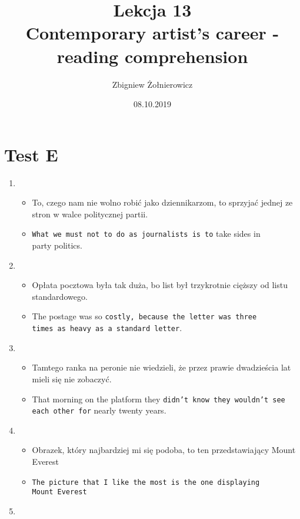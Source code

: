 \documentclass[a4paper]{article}
\begin{document}
\title{{\huge Lekcja 13} \\
{\large Contemporary artist's career - reading comprehension}}
\author{Zbigniew Żołnierowicz}
\date{08.10.2019}
\maketitle
\section{Test E}
\begin{enumerate}
    \item \begin{itemize}
        \item To, czego nam nie wolno robić jako dziennikarzom, to sprzyjać jednej ze stron w walce politycznej partii.
        \item {\tt What we must not to do as journalists is to} take sides in\\party politics.
    \end{itemize}
    \item \begin{itemize}
        \item Opłata pocztowa była tak duża, bo list był trzykrotnie cięższy od listu standardowego.
        \item The postage was so {\tt costly, because the letter was three\\times as heavy as a standard letter}.
    \end{itemize}
    \item \begin{itemize}
        \item Tamtego ranka na peronie nie wiedzieli, że przez prawie dwadzieścia lat mieli się nie zobaczyć.
        \item That morning on the platform they {\tt didn't know they wouldn't see each other for} nearly twenty years.
    \end{itemize}
    \item \begin{itemize}
        \item Obrazek, który najbardziej mi się podoba, to ten przedstawiający Mount Everest
        \item {\tt The picture that I like the most is the one displaying\\Mount Everest}
    \end{itemize}
    \item \begin{itemize}

\end{itemize}
\end{enumerate}
\end{document}
